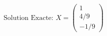 \documentclass[preview]{standalone}
\begin{document}
\begin{align*}
\text{Solution Exacte: } X = \begin{pmatrix} 1 \\ 4/9 \\ -1/9 \end{pmatrix}
\end{align*}
\end{document}
